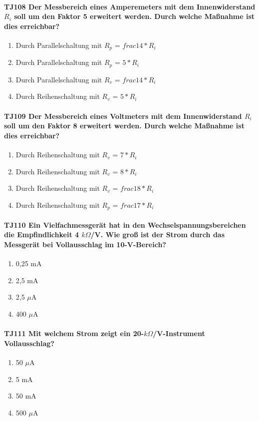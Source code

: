\documentclass[8pt]{article}
\begin{document}
\paragraph*{TJ108 Der Messbereich eines Amperemeters mit dem Innenwiderstand $R_{i}$ soll um den Faktor 5 erweitert werden. Durch welche Maßnahme ist dies erreichbar?}
\begin{enumerate}[nolistsep,label=\Alph*]
\item Durch Parallelschaltung mit $R_{p}$ = $frac{1}{4}*R_{i}$
\item Durch Parallelschaltung mit $R_{p}$ = $5*R_{i}$
\item Durch Parallelschaltung mit $R_{v}$ = $frac{1}{4}*R_{i}$
\item Durch Reihenschaltung mit $R_{v}$ = $5*R_{i}$
\end{enumerate}

\paragraph*{TJ109 Der Messbereich eines Voltmeters mit dem Innenwiderstand $R_{i}$ soll um den Faktor 8 erweitert werden. Durch welche Maßnahme ist dies erreichbar?}
\begin{enumerate}[nolistsep,label=\Alph*]
\item Durch Reihenschaltung mit $R_{v}$ = $7*R_{i}$
\item Durch Reihenschaltung mit $R_{v}$ = $8*R_{i}$
\item Durch Reihenschaltung mit $R_{v}$ = $frac{1}{8}*R_{i}$
\item Durch Reihenschaltung mit $R_{p}$ = $frac{1}{7}*R_{i}$
\end{enumerate}

\paragraph*{TJ110 Ein Vielfachmessgerät hat in den Wechselspannungsbereichen die Empfindlichkeit 4 $k\Omega$/V. Wie groß ist der Strom durch das Messgerät bei Vollausschlag im 10-V-Bereich?}
\begin{enumerate}[nolistsep,label=\Alph*]
\item 0,25 mA
\item 2,5 mA
\item 2,5 $\mu$A
\item 400 $\mu$A
\end{enumerate}

\paragraph*{TJ111 Mit welchem Strom zeigt ein 20-$k\Omega$/V-Instrument Vollausschlag?}
\begin{enumerate}[nolistsep,label=\Alph*]
\item 50 $\mu$A
\item 5 mA
\item 50 mA
\item 500 $\mu$A
\end{enumerate}
\end{document}
